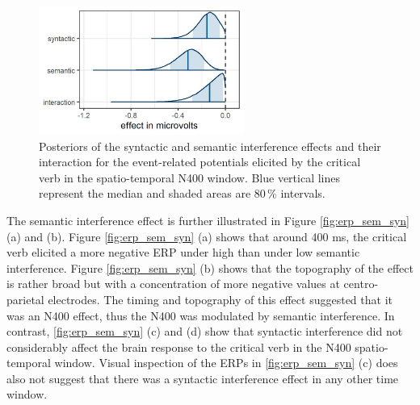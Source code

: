 \documentclass[a4paper, man, floatsintext]{apa7}
\begin{document}
\begin{figure}[H]
    \caption{Posteriors of the syntactic and semantic interference effects and their interaction for the event-related potentials elicited by the critical verb in the spatio-temporal N400 window. Blue vertical lines represent the median and shaded areas are 80\,\% intervals.}
    \label{fig:eeg_posteriors}
    \centering
    \includegraphics[width=0.6\textwidth]{images/posteriors_eeg.jpg}
\end{figure}


The semantic interference effect is further illustrated in Figure \ref{fig:erp_sem_syn} (a) and (b). Figure \ref{fig:erp_sem_syn} (a) shows that around 400 ms, the critical verb elicited a more negative ERP under high than under low semantic interference. Figure \ref{fig:erp_sem_syn} (b) shows that the topography of the effect is rather broad but with a concentration of more negative values at centro-parietal electrodes. The timing and topography of this effect suggested that it was an N400 effect, thus the N400 was modulated by semantic interference. In contrast, \ref{fig:erp_sem_syn} (c) and (d) show that syntactic interference did not considerably affect the brain response to the critical verb in the N400 spatio-temporal window. Visual inspection of the ERPs in \ref{fig:erp_sem_syn} (c) does also not suggest that there was a syntactic interference effect in any other time window.
\end{document}
